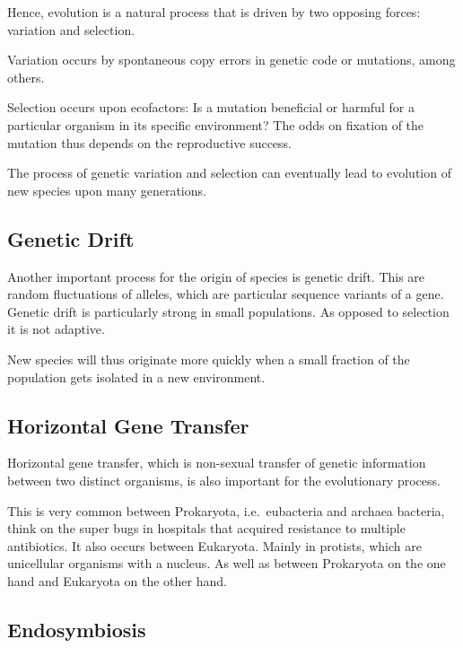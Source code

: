 \documentclass[
  11pt,
]{book}
\begin{document}
Hence, evolution is a natural process that is driven by two opposing forces: variation and selection.

Variation occurs by spontaneous copy errors in genetic code or mutations, among others.

Selection occurs upon ecofactors: Is a mutation beneficial or harmful for a particular organism in its specific environment?
The odds on fixation of the mutation thus depends on the reproductive success.

The process of genetic variation and selection can eventually lead to evolution of new species upon many generations.

\hypertarget{genetic-drift}{%
\subsection{Genetic Drift}\label{genetic-drift}}

Another important process for the origin of species is genetic drift. This are random fluctuations of alleles, which are particular sequence variants of a gene. Genetic drift is particularly strong in small populations. As opposed to selection it is not adaptive.

New species will thus originate more quickly when a small fraction of the population gets isolated in a new environment.

\hypertarget{horizontal-gene-transfer}{%
\subsection{Horizontal Gene Transfer}\label{horizontal-gene-transfer}}

Horizontal gene transfer, which is non-sexual transfer of genetic information between two distinct organisms, is also important for the evolutionary process.

This is very common between Prokaryota, i.e.~eubacteria and archaea bacteria, think on the super bugs in hospitals that acquired resistance to multiple antibiotics. It also occurs between Eukaryota. Mainly in protists, which are unicellular organisms with a nucleus. As well as between Prokaryota on the one hand and Eukaryota on the other hand.

\hypertarget{endosymbiosis}{%
\subsection{Endosymbiosis}\label{endosymbiosis}}
\end{document}
